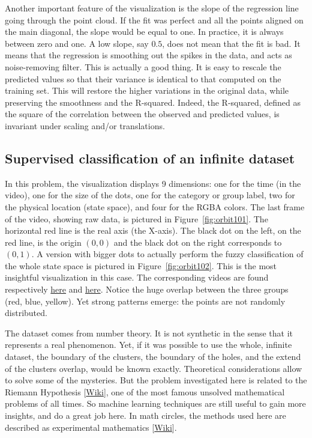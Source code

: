 \documentclass[oneside,10pt]{book}
\begin{document}
Another important feature of the visualization is the slope of the regression line going through the point cloud. If the fit was perfect and all the points aligned on the main diagonal, the slope would be equal to one. In practice, it is always between zero and one. A low slope, say $0.5$, does not mean that the fit is bad. It means that the regression is smoothing out the spikes in the data, and acts as noise-removing filter. This is actually a good thing. It is easy to rescale the predicted values so that their variance is identical to that computed on the training set. This will restore the higher variations in the original data, while preserving the smoothness and the R-squared. Indeed, the R-squared, defined as the square of the correlation between the observed and predicted values, is invariant under scaling and/or translations.

\subsection{Supervised classification of an infinite dataset}\label{scidf}

In this problem, the visualization displays 9 dimensions: one for the time (in the video), one for the size of the dots, one for the category or group label, two for the physical location (state space), and four for the RGBA colors. The last frame of the video, showing raw data, is pictured in Figure~\ref{fig:orbit101}. 
The horizontal red line is the real axis (the X-axis).  The black dot on the left, on the red line, is the origin $(0,0)$ and the black dot on the right corresponds to $(0,1)$.  A version with bigger dots to actually perform the
\textcolor{index}{fuzzy classification} of the whole state space is pictured in Figure~\ref{fig:orbit102}. This is the most insightful visualization in this case. The corresponding videos are found respectively \href{https://youtu.be/HT8e3WsRLZI}{here} and \href{https://youtu.be/rRQbxpZAQ78}{here}. Notice the huge overlap between the three groups (red, blue, yellow). Yet strong patterns emerge: the points are not randomly distributed.

The dataset comes from number theory. It is not synthetic in the sense that it represents a real phenomenon. Yet, if it was possible to use the whole, infinite dataset, the boundary of the clusters, the boundary of the holes, and the extend of the clusters overlap, would be known exactly. Theoretical considerations allow to solve some of the mysteries. But the problem investigated here is related to the Riemann Hypothesis [\href{https://en.wikipedia.org/wiki/Riemann_hypothesis}{Wiki}], one of the most famous unsolved
mathematical problems of all times. So machine learning techniques are still useful to gain more insights, and do a great job here. In math circles, the
methods used here are described as \textcolor{index}{experimental mathematics} [\href{https://en.wikipedia.org/wiki/Experimental_mathematics}{Wiki}]. 
\end{document}
